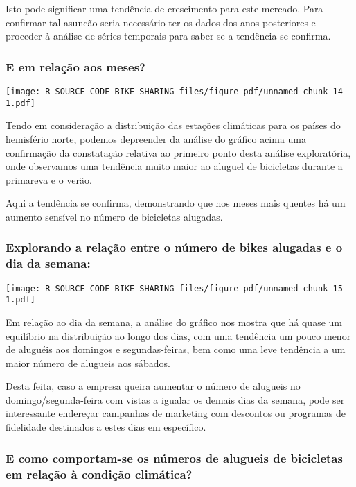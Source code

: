 \documentclass[
  letterpaper,
  DIV=11,
  numbers=noendperiod]{scrartcl}
\begin{document}
Isto pode significar uma tendência de crescimento para este mercado.
Para confirmar tal asuncão seria necessário ter os dados dos anos
posteriores e proceder à análise de séries temporais para saber se a
tendência se confirma.

\subsubsection{E em relação aos
meses?}\label{e-em-relauxe7uxe3o-aos-meses}

\begin{center}
\texttt{[image: R\_SOURCE\_CODE\_BIKE\_SHARING\_files/figure-pdf/unnamed-chunk-14-1.pdf]}
\end{center}

Tendo em consideração a distribuição das estações climáticas para os
países do hemisfério norte, podemos depreender da análise do gráfico
acima uma confirmação da constatação relativa ao primeiro ponto desta
análise exploratória, onde observamos uma tendência muito maior ao
aluguel de bicicletas durante a primareva e o verão.

Aqui a tendência se confirma, demonstrando que nos meses mais quentes há
um aumento sensível no número de bicicletas alugadas.

\subsubsection{Explorando a relação entre o número de bikes alugadas e o
dia da
semana:}\label{explorando-a-relauxe7uxe3o-entre-o-nuxfamero-de-bikes-alugadas-e-o-dia-da-semana}

\begin{center}
\texttt{[image: R\_SOURCE\_CODE\_BIKE\_SHARING\_files/figure-pdf/unnamed-chunk-15-1.pdf]}
\end{center}

Em relação ao dia da semana, a análise do gráfico nos mostra que há
quase um equilíbrio na distribuição ao longo dos dias, com uma tendência
um pouco menor de aluguéis aos domingos e segundas-feiras, bem como uma
leve tendência a um maior número de alugueis aos sábados.

Desta feita, caso a empresa queira aumentar o número de alugueis no
domingo/segunda-feira com vistas a igualar os demais dias da semana,
pode ser interessante endereçar campanhas de marketing com descontos ou
programas de fidelidade destinados a estes dias em específico.

\subsubsection{E como comportam-se os números de alugueis de bicicletas
em relação à condição
climática?}\label{e-como-comportam-se-os-nuxfameros-de-alugueis-de-bicicletas-em-relauxe7uxe3o-uxe0-condiuxe7uxe3o-climuxe1tica}
\end{document}

